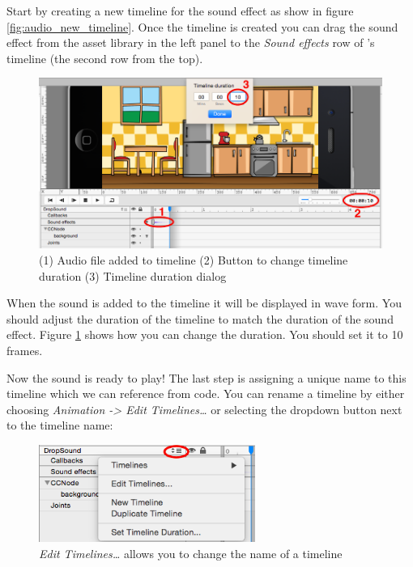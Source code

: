 Start by creating a new timeline for the sound effect as show in figure
\ref{fig:audio_new_timeline}. Once the timeline is created you can drag the
sound effect from the asset library in the left panel to the \textit{Sound
effects} row of \SB{}'s timeline (the second row from the top).

\begin{figure}[H]
		\centering
		\includegraphics[width=0.9\linewidth]{images/Chapter2/audio_timeline.png}
		\caption{(1) Audio file added to timeline\newline{} (2)
		Button to change timeline duration\newline{} (3) Timeline
		duration dialog\newline{}}\label{fig:change_timeline_duration}
\end{figure}

When the sound is added to the timeline it will be displayed in wave form. You
should adjust the duration of the timeline to match the duration of the sound
effect. Figure \ref{fig:change_timeline_duration} shows how you can change the
duration. You should set it to 10 frames.

Now the sound is ready to play! The last step is assigning a unique name to this
timeline which we can reference from code. You can rename a timeline by either
choosing \textit{Animation -> Edit Timelines\ldots} or selecting the dropdown
button next to the timeline name:

\begin{figure}[H]
		\centering
		\includegraphics[width=200pt]{images/Chapter2/edit_timeline.png}
		\caption{\textit{Edit Timelines\ldots} allows you to change the name of a
		timeline}
\end{figure}

